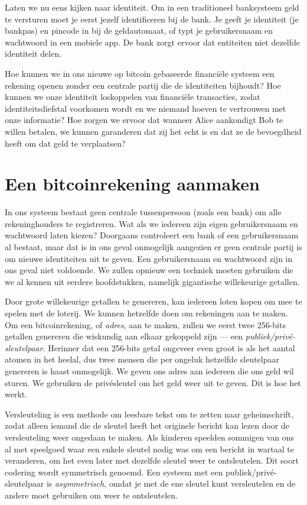 \documentclass[
  letterpaper,
]{scrbook}
\begin{document}
Laten we nu eens kijken naar identiteit. Om in een traditioneel
banksysteem geld te versturen moet je eerst jezelf identificeren bij de
bank. Je geeft je identiteit (je bankpas) en pincode in bij de
geldautomaat, of typt je gebruikersnaam en wachtwoord in een mobiele
app. De bank zorgt ervoor dat entiteiten niet dezelfde identiteit delen.

Hoe kunnen we in ons nieuwe op bitcoin gebaseerde financiële systeem een
rekening openen zonder een centrale partij die de identiteiten bijhoudt?
Hoe kunnen we onze identiteit loskoppelen van financiële transacties,
zodat identiteitsdiefstal voorkomen wordt en we niemand hoeven te
vertrouwen met onze informatie? Hoe zorgen we ervoor dat wanneer Alice
aankondigt Bob te willen betalen, we kunnen garanderen dat zij het echt
is en dat ze de bevoegdheid heeft om dat geld te verplaatsen?

\hypertarget{een-bitcoinrekening-aanmaken}{%
\section{Een bitcoinrekening
aanmaken}\label{een-bitcoinrekening-aanmaken}}

In ons systeem bestaat geen centrale tussenpersoon (zoals een bank) om
alle rekeninghouders te registreren. Wat als we iedereen zijn eigen
gebruikersnaam en wachtwoord laten kiezen? Doorgaans controleert een
bank of een gebruikersnaam al bestaat, maar dat is in ons geval
onmogelijk aangezien er geen centrale partij is om nieuwe identiteiten
uit te geven. Een gebruikersnaam en wachtwoord zijn in ons geval niet
voldoende. We zullen opnieuw een techniek moeten gebruiken die we al
kennen uit eerdere hoofdstukken, namelijk gigantische willekeurige
getallen.

Door grote willekeurige getallen te genereren, kan iedereen loten kopen
om mee te spelen met de loterij. We kunnen hetzelfde doen om rekeningen
aan te maken. Om een bitcoinrekening, of \emph{adres}, aan te maken,
zullen we eerst twee 256-bits getallen genereren die wiskundig aan
elkaar gekoppeld zijn --- een \emph{publiek/privé-sleutelpaar}. Herinner
dat een 256-bits getal ongeveer even groot is als het aantal atomen in
het heelal, dus twee mensen die per ongeluk hetzelfde sleutelpaar
genereren is haast onmogelijk. We geven ons adres aan iedereen die ons
geld wil sturen. We gebruiken de privésleutel om het geld weer uit te
geven. Dit is hoe het werkt.

Versleuteling is een methode om leesbare tekst om te zetten naar
geheimschrift, zodat alleen iemand die de sleutel heeft het originele
bericht kan lezen door de versleuteling weer ongedaan te maken. Als
kinderen speelden sommigen van ons al met speelgoed waar een enkele
sleutel nodig was om een bericht in wartaal te veranderen, om het even
later met dezelfde sleutel weer te ontsleutelen. Dit soort codering
wordt symmetrisch genoemd. Een systeem met een publiek/privé-sleutelpaar
is \emph{asymmetrisch}, omdat je met de ene sleutel kunt versleutelen en
de andere moet gebruiken om weer te ontsleutelen.
\end{document}
